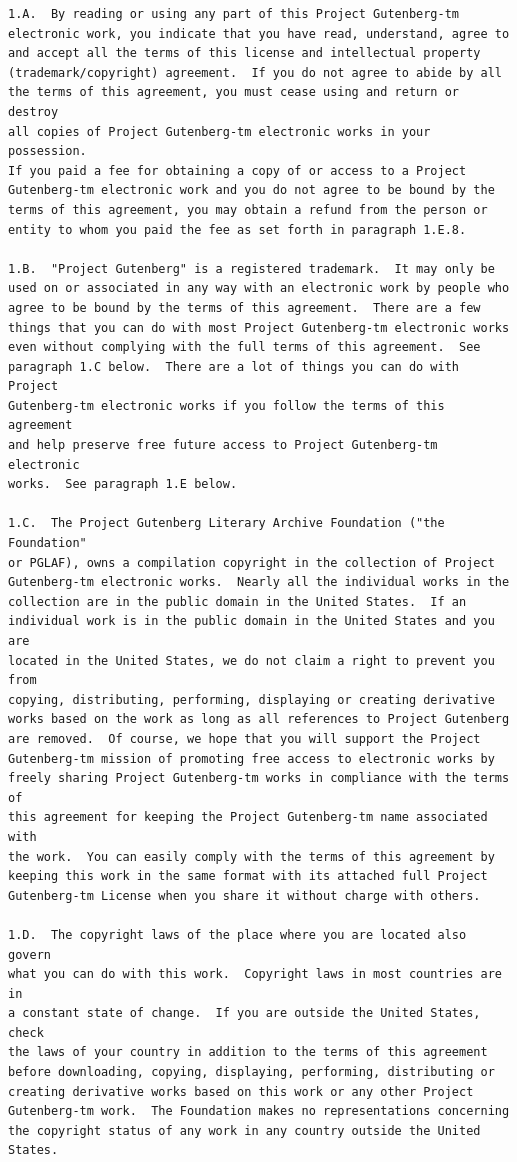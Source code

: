 \documentclass{book}
\begin{document}
\begin{verbatim}
1.A.  By reading or using any part of this Project Gutenberg-tm
electronic work, you indicate that you have read, understand, agree to
and accept all the terms of this license and intellectual property
(trademark/copyright) agreement.  If you do not agree to abide by all
the terms of this agreement, you must cease using and return or destroy
all copies of Project Gutenberg-tm electronic works in your possession.
If you paid a fee for obtaining a copy of or access to a Project
Gutenberg-tm electronic work and you do not agree to be bound by the
terms of this agreement, you may obtain a refund from the person or
entity to whom you paid the fee as set forth in paragraph 1.E.8.

1.B.  "Project Gutenberg" is a registered trademark.  It may only be
used on or associated in any way with an electronic work by people who
agree to be bound by the terms of this agreement.  There are a few
things that you can do with most Project Gutenberg-tm electronic works
even without complying with the full terms of this agreement.  See
paragraph 1.C below.  There are a lot of things you can do with Project
Gutenberg-tm electronic works if you follow the terms of this agreement
and help preserve free future access to Project Gutenberg-tm electronic
works.  See paragraph 1.E below.

1.C.  The Project Gutenberg Literary Archive Foundation ("the Foundation"
or PGLAF), owns a compilation copyright in the collection of Project
Gutenberg-tm electronic works.  Nearly all the individual works in the
collection are in the public domain in the United States.  If an
individual work is in the public domain in the United States and you are
located in the United States, we do not claim a right to prevent you from
copying, distributing, performing, displaying or creating derivative
works based on the work as long as all references to Project Gutenberg
are removed.  Of course, we hope that you will support the Project
Gutenberg-tm mission of promoting free access to electronic works by
freely sharing Project Gutenberg-tm works in compliance with the terms of
this agreement for keeping the Project Gutenberg-tm name associated with
the work.  You can easily comply with the terms of this agreement by
keeping this work in the same format with its attached full Project
Gutenberg-tm License when you share it without charge with others.

1.D.  The copyright laws of the place where you are located also govern
what you can do with this work.  Copyright laws in most countries are in
a constant state of change.  If you are outside the United States, check
the laws of your country in addition to the terms of this agreement
before downloading, copying, displaying, performing, distributing or
creating derivative works based on this work or any other Project
Gutenberg-tm work.  The Foundation makes no representations concerning
the copyright status of any work in any country outside the United
States.


\end{verbatim}
\end{document}
